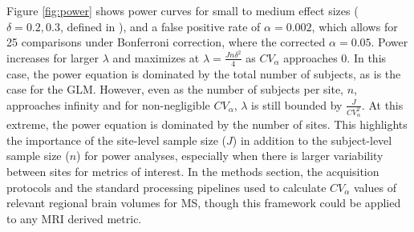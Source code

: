 Figure \ref{fig:power} shows power curves for small to medium effect sizes ($\delta = 0.2, 0.3$, defined in \cite{Raudenbush2000}), and a false positive rate of $\alpha = 0.002$, which allows for 25 comparisons under Bonferroni correction, where the corrected $\alpha = 0.05$. Power increases for larger $\lambda$  and maximizes at $\lambda = \frac{Jn\delta^2}{4}$ as $CV_\alpha$ approaches 0. In this case, the power equation is dominated by the total number of subjects, as is the case for the GLM. However, even as the number of subjects per site, $n$, approaches infinity and for non-negligible $CV_\alpha$, $\lambda$ is still bounded by $\frac{J}{CV_\alpha^2}$. At this extreme, the  power equation is dominated by the number of sites. This highlights the importance of the site-level sample size ($J$) in addition to the subject-level sample size ($n$) for power analyses, especially when there is larger variability between sites for metrics of interest. In the methods section, the acquisition protocols and the standard processing pipelines used to calculate $CV_\alpha$ values of relevant regional brain volumes for MS, though this framework could be applied to any MRI derived metric.